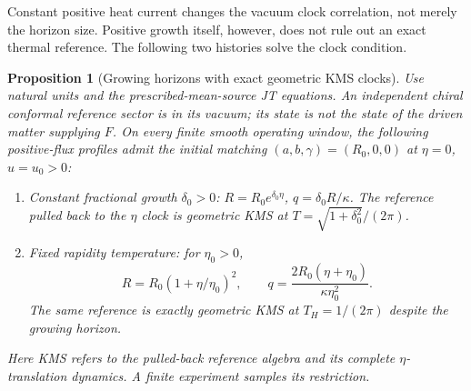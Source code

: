 \documentclass[12pt,a4paper]{article}
\newtheorem{proposition}[theorem]{Proposition}
\begin{document}
Constant positive heat current changes the vacuum clock correlation, not merely
the horizon size. Positive growth itself, however, does not rule out an exact
thermal reference. The following two histories solve the clock condition.

\begin{proposition}[Growing horizons with exact geometric KMS clocks]
\label{prop:running-kms}
Use natural units and the prescribed-mean-source JT equations. An independent
chiral conformal reference sector is in its vacuum; its state is not the state
of the driven matter supplying $F$. On every finite smooth operating window,
the following positive-flux profiles admit the initial matching
$(a,b,\gamma)=(R_0,0,0)$ at $\eta=0$, $u=u_0>0$:
\begin{enumerate}
\item Constant fractional growth $\delta_0>0$:
$R=R_0e^{\delta_0\eta}$, $q=\delta_0R/\kappa$. The reference pulled back
to the $\eta$ clock is geometric KMS at $T=\sqrt{1+\delta_0^2}/(2\pi)$.
\item Fixed rapidity temperature: for $\eta_0>0$,
\begin{equation}\label{eq:fixed-temperature-growth}
 R=R_0(1+\eta/\eta_0)^2,\qquad
 q=\frac{2R_0(\eta+\eta_0)}{\kappa\eta_0^2}.
\end{equation}
The same reference is exactly geometric KMS at $T_H=1/(2\pi)$ despite
the growing horizon.
\end{enumerate}
Here KMS refers to the pulled-back reference algebra and its complete
$\eta$-translation dynamics. A finite experiment samples its restriction.
\end{proposition}
\end{document}
